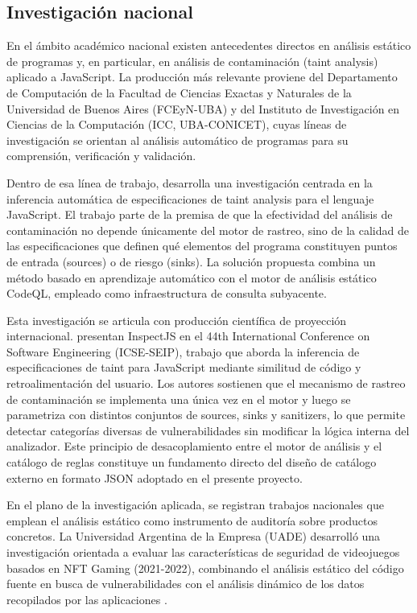 \subsection{Investigación nacional}\label{sec:n3.1.1}

En el ámbito académico nacional existen antecedentes directos en análisis estático de programas y, en particular, en análisis de contaminación (taint analysis) aplicado a JavaScript. La producción más relevante proviene del Departamento de Computación de la Facultad de Ciencias Exactas y Naturales de la Universidad de Buenos Aires (FCEyN-UBA) y del Instituto de Investigación en Ciencias de la Computación (ICC, UBA-CONICET), cuyas líneas de investigación se orientan al análisis automático de programas para su comprensión, verificación y validación.

Dentro de esa línea de trabajo, \citet{balbi2023} desarrolla una investigación centrada en la inferencia automática de especificaciones de taint analysis para el lenguaje JavaScript. El trabajo parte de la premisa de que la efectividad del análisis de contaminación no depende únicamente del motor de rastreo, sino de la calidad de las especificaciones que definen qué elementos del programa constituyen puntos de entrada (sources) o de riesgo (sinks). La solución propuesta combina un método basado en aprendizaje automático con el motor de análisis estático CodeQL, empleado como infraestructura de consulta subyacente.

Esta investigación se articula con producción científica de proyección internacional. \citet{dutta2022} presentan InspectJS en el 44th International Conference on Software Engineering (ICSE-SEIP), trabajo que aborda la inferencia de especificaciones de taint para JavaScript mediante similitud de código y retroalimentación del usuario. Los autores sostienen que el mecanismo de rastreo de contaminación se implementa una única vez en el motor y luego se parametriza con distintos conjuntos de sources, sinks y sanitizers, lo que permite detectar categorías diversas de vulnerabilidades sin modificar la lógica interna del analizador. Este principio de desacoplamiento entre el motor de análisis y el catálogo de reglas constituye un fundamento directo del diseño de catálogo externo en formato JSON adoptado en el presente proyecto.

En el plano de la investigación aplicada, se registran trabajos nacionales que emplean el análisis estático como instrumento de auditoría sobre productos concretos. La Universidad Argentina de la Empresa (UADE) desarrolló una investigación orientada a evaluar las características de seguridad de videojuegos basados en NFT Gaming (2021-2022), combinando el análisis estático del código fuente en busca de vulnerabilidades con el análisis dinámico de los datos recopilados por las aplicaciones \citep{villan2022}.


